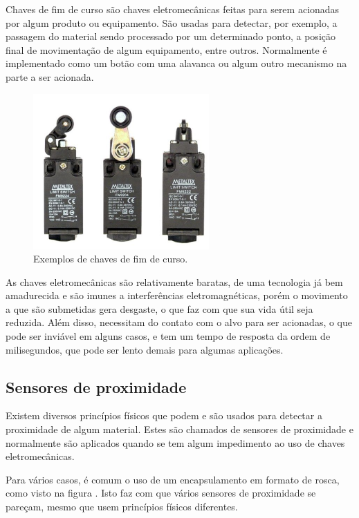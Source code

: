 Chaves de fim de curso são chaves eletromecânicas feitas para serem acionadas por algum produto ou equipamento. São usadas para detectar, por exemplo, a passagem do material sendo processado por um determinado ponto, a posição final de movimentação de algum equipamento, entre outros. Normalmente é implementado como um botão com uma alavanca ou algum outro mecanismo na parte a ser acionada.

\begin{figure}
  \centering
  \includegraphics[width=0.6\textwidth]{figuras/fim-de-curso}
  \caption{Exemplos de chaves de fim de curso.}\label{fig:fim-de-curso}
\end{figure}

As chaves eletromecânicas são relativamente baratas, de uma tecnologia já bem amadurecida e são imunes a interferências eletromagnéticas, porém o movimento a que são submetidas gera desgaste, o que faz com que sua vida útil seja reduzida. Além disso, necessitam do contato com o alvo para ser acionadas, o que pode ser inviável em alguns casos, e tem um tempo de resposta da ordem de milisegundos, que pode ser lento demais para algumas aplicações.

\subsection{Sensores de proximidade}

 Existem diversos princípios físicos que podem e são usados para detectar a proximidade de algum material. Estes são chamados de sensores de proximidade e normalmente são aplicados quando se tem algum impedimento ao uso de chaves eletromecânicas.

Para vários casos, é comum o uso de um encapsulamento em formato de rosca, como visto na figura . Isto faz com que vários sensores de proximidade se pareçam, mesmo que usem princípios físicos diferentes.

